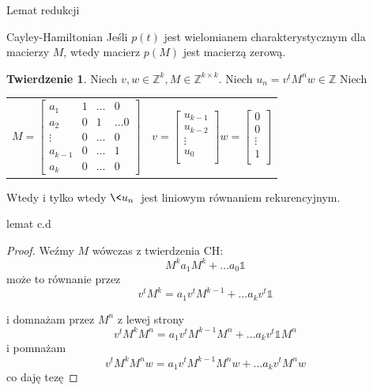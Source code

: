 \documentclass[handout]{beamer}
\def\Z{\mathbb Z}
\theoremstyle{definition}
\newtheorem*{twierdzenie}{Twierdzenie}
\begin{document}
\begin{frame}{Lemat redukcji}

\begin{theorem}{Cayley-Hamiltonian}
    Jeśli $p(t)$ jest wielomianem charakterystycznym dla macierzy $M$, wtedy macierz $p(M)$ jest macierzą zerową. 
\end{theorem}

\begin{twierdzenie}

    Niech $v, w \in \Z^{k}, M \in \Z^{k\times k}$.
    Niech $u_n = v^{t}M^{n}w \in \Z$
        Niech
    \begin{table}[]
        \centering
        \begin{tabular}{c|c}
    $
    M = \begin{bmatrix}
    a_{1} & 1 &  \ldots & 0 \\
    a_{2} & 0 & 1 & \ldots 0  \\
    \vdots & 0 & \ldots & 0 \\ 
    a_{k-1} & 0 & \ldots & 1 \\
    a_{k} & 0 & \ldots & 0
    \end{bmatrix}
    $
             &  
    $v= \begin{bmatrix}
    u_{k-1} \\ u_{k-2} \\ \vdots \\ u_{0} \\
    \end{bmatrix}
    w =  \begin{bmatrix}
    0 \\ 0 \\ \vdots \\ 1 \\
    \end{bmatrix}
    $
             & 
        \end{tabular}

    \end{table}
    
    Wtedy i tylko wtedy $\<u_n\>$ jest liniowym równaniem rekurencyjnym. 

\end{twierdzenie}

\end{frame}

\begin{frame}{lemat c.d}

\begin{proof}
    Weźmy $M$ wówczas z twierdzenia CH: 
    $$M^{k} a_1 M^{k} + \ldots a_0 \mathbb{1}$$ 
    może to równanie przez 
    $$ v^{t}M^{k} = a_1 v^{t} M^{k-1} + \ldots a_k v^{t} \mathbb{1}$$ 


i domnażam przez $M^{n}$ z lewej strony 
      $$ v^{t}M^{k} M^{n} = a_1 v^{t} M^{k-1} M^{n} + \ldots a_k v^{t} \mathbb{1} M^{n}$$ 
      i pomnażam 
      $$ v^{t}M^{k} M^{n} w = a_1 v^{t} M^{k-1} M^{n}w + \ldots a_k v^{t} M^{n}w $$ 
      co daję tezę
\end{proof}
\end{frame}
\end{document}
